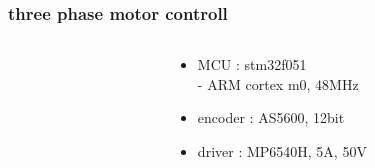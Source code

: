 \documentclass{beamer}
\begin{document}
\begin{frame}
  
  \frametitle{three phase motor controll}    

  \begin{columns}

    \begin{column}{0.5\textwidth}
    \end{column}

    \begin{column}{0.5\textwidth}
      \begin{itemize}
        \item MCU     : stm32f051 \\ 
          - ARM cortex m0, 48MHz
        \item encoder : AS5600, 12bit
        \item driver  : MP6540H, 5A, 50V
      \end{itemize}
    \end{column}

  \end{columns}

\end{frame}
\end{document}
